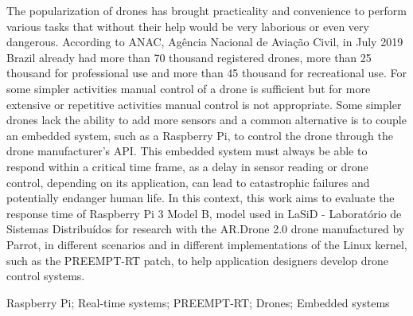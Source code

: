 \abstract
The popularization of drones has brought practicality and convenience to perform various tasks that without their help would be very laborious or even very dangerous. According to ANAC, Agência Nacional de Aviação Civil, in July 2019 Brazil already had more than 70 thousand registered drones, more than 25 thousand for professional use and more than 45 thousand for recreational use. For some simpler activities manual control of a drone is sufficient but for more extensive or repetitive activities manual control is not appropriate. Some simpler drones lack the ability to add more sensors and a common alternative is to couple an embedded system, such as a Raspberry Pi, to control the drone through the drone manufacturer's API. This embedded system must always be able to respond within a critical time frame, as a delay in sensor reading or drone control, depending on its application, can lead to catastrophic failures and potentially endanger human life. In this context, this work aims to evaluate the response time of Raspberry Pi 3 Model B, model used in LaSiD - Laboratório de Sistemas Distribuídos for research with the AR.Drone 2.0 drone manufactured by Parrot, in different scenarios and in different implementations of the Linux kernel, such as the PREEMPT-RT patch, to help application designers develop drone control systems.

\begin{keywords}
Raspberry Pi; Real-time systems; PREEMPT-RT; Drones; Embedded systems
\end{keywords}
